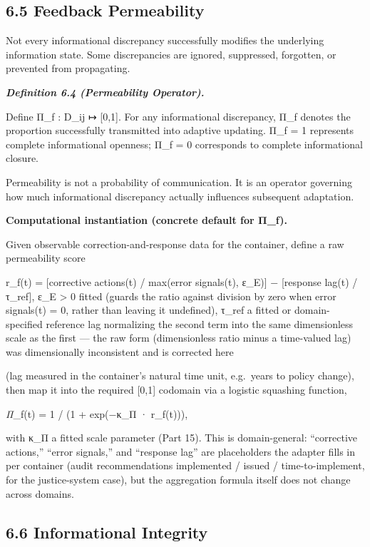 \documentclass[
]{article}
\begin{document}
\hypertarget{feedback-permeability}{%
\subsection{6.5 Feedback Permeability}\label{feedback-permeability}}

Not every informational discrepancy successfully modifies the underlying
information state. Some discrepancies are ignored, suppressed,
forgotten, or prevented from propagating.

\emph{\textbf{Definition 6.4 (Permeability Operator).}}

Define Π\_f : D\_ij ↦ {[}0,1{]}. For any informational discrepancy, Π\_f
denotes the proportion successfully transmitted into adaptive updating.
Π\_f = 1 represents complete informational openness; Π\_f = 0
corresponds to complete informational closure.

Permeability is not a probability of communication. It is an operator
governing how much informational discrepancy actually influences
subsequent adaptation.

\textbf{Computational instantiation (concrete default for Π\_f).}

Given observable correction-and-response data for the container, define
a raw permeability score

r\_f(t) = {[}corrective actions(t) / max(error signals(t), ε\_E){]} −
{[}response lag(t) / τ\_ref{]}, ε\_E \textgreater{} 0 fitted (guards the
ratio against division by zero when error signals(t) = 0, rather than
leaving it undefined), τ\_ref a fitted or domain-specified reference lag
normalizing the second term into the same dimensionless scale as the
first --- the raw form (dimensionless ratio minus a time-valued lag) was
dimensionally inconsistent and is corrected here

(lag measured in the container's natural time unit, e.g.~years to policy
change), then map it into the required {[}0,1{]} codomain via a logistic
squashing function,

\emph{Π}\_f(t) = 1 / (1 + exp(−κ\_Π · r\_f(t))),

with κ\_Π a fitted scale parameter (Part 15). This is domain-general:
``corrective actions,'' ``error signals,'' and ``response lag'' are
placeholders the adapter fills in per container (audit recommendations
implemented / issued / time-to-implement, for the justice-system case),
but the aggregation formula itself does not change across domains.

\hypertarget{informational-integrity}{%
\subsection{6.6 Informational Integrity}\label{informational-integrity}}
\end{document}
